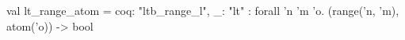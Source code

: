 val lt_range_atom = {coq: "ltb_range_l", _: "lt"}     : forall 'n 'm 'o. (range('n, 'm), atom('o)) -> bool
